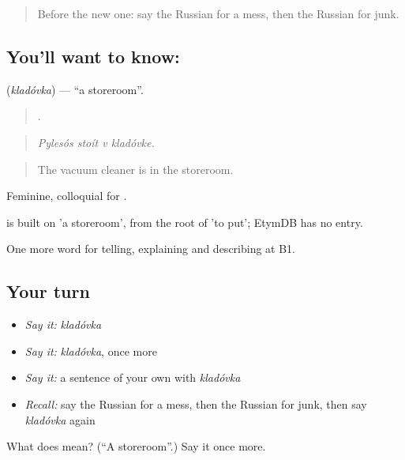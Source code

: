 \begin{quote}
Before the new one: say the Russian for a mess, then the Russian for junk.
\end{quote}

\subsection*{You'll want to know: }
\textbf{} (\emph{kladóvka}) — \textquotedblleft{}a storeroom\textquotedblright{}.

\begin{quote}
   .
\end{quote}

\begin{quote}
\emph{Pylesós stoít v kladóvke.}
\end{quote}

\begin{quote}
The vacuum cleaner is in the storeroom.
\end{quote}

Feminine, colloquial for \emph{}.

\begin{cousinweb}
\emph{} is built on \emph{} 'a storeroom', from the root of \emph{} 'to put'; EtymDB has no entry.
\end{cousinweb}

\begin{grammarlens}[title={What you've built}]
One more word for telling, explaining and describing at B1.
\end{grammarlens}

\subsection*{Your turn}
\begin{itemize}
\raggedright
  \item \emph{Say it:} \emph{kladóvka}
  \item \emph{Say it:} \emph{kladóvka}, once more
  \item \emph{Say it:} a sentence of your own with \emph{kladóvka}
  \item \emph{Recall:} say the Russian for a mess, then the Russian for junk, then say \emph{kladóvka} again
\end{itemize}

\begin{tcolorbox}[breakable,colback=teal!4,colframe=teal!35!black,title={Before you move on}]
What does  mean? (\textquotedblleft{}A storeroom\textquotedblright{}.) Say it once more.
\end{tcolorbox}
